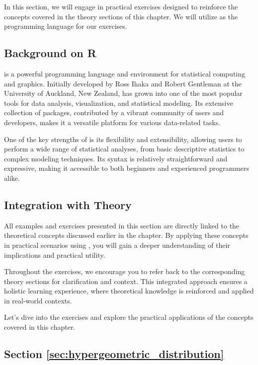 In this section, we will engage in practical exercises designed to reinforce the concepts covered in the theory sections of this chapter. We will utilize  as the programming language for our exercises.

\subsection*{Background on R}

 is a powerful programming language and environment for statistical computing and graphics. Initially developed by Ross Ihaka and Robert Gentleman at the University of Auckland, New Zealand,  has grown into one of the most popular tools for data analysis, visualization, and statistical modeling. Its extensive collection of packages, contributed by a vibrant community of users and developers, makes it a versatile platform for various data-related tasks.

One of the key strengths of  is its flexibility and extensibility, allowing users to perform a wide range of statistical analyses, from basic descriptive statistics to complex modeling techniques. Its syntax is relatively straightforward and expressive, making it accessible to both beginners and experienced programmers alike.

\subsection*{Integration with Theory}

All examples and exercises presented in this section are directly linked to the theoretical concepts discussed earlier in the chapter. By applying these concepts in practical scenarios using , you will gain a deeper understanding of their implications and practical utility.

Throughout the exercises, we encourage you to refer back to the corresponding theory sections for clarification and context. This integrated approach ensures a holistic learning experience, where theoretical knowledge is reinforced and applied in real-world contexts.

Let's dive into the exercises and explore the practical applications of the concepts covered in this chapter.

\subsection{Section \ref{sec:hypergeometric_distribution}}


